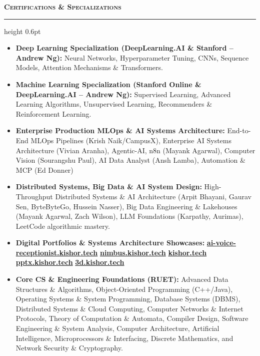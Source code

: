 \documentclass[9.5pt,a4paper]{article}
\newcommand{\resumesection}[1]{%
    \vspace{4.0pt}%
    {\color{burgundy}\scshape\bfseries\fontsize{10.0pt}{11.2pt}\selectfont #1}%
    \vspace{1.0pt}%
    \hrule height 0.6pt\relax%
    \vspace{2.5pt}%
}
\begin{document}
\resumesection{Certifications \& Specializations}
\begin{itemize}
    \item \textbf{Deep Learning Specialization (DeepLearning.AI \& Stanford -- Andrew Ng):} Neural Networks, Hyperparameter Tuning, CNNs, Sequence Models, Attention Mechanisms \& Transformers.
    \item \textbf{Machine Learning Specialization (Stanford Online \& DeepLearning.AI -- Andrew Ng):} Supervised Learning, Advanced Learning Algorithms, Unsupervised Learning, Recommenders \& Reinforcement Learning.
    \item \textbf{Enterprise Production MLOps \& AI Systems Architecture:} End-to-End MLOps Pipelines (Krish Naik/CampusX), Enterprise AI Systems Architecture (Vivian Aranha), Agentic-AI, n8n (Mayank Agarwal), Computer Vision (Sourangshu Paul), AI Data Analyst (Ansh Lamba), Automation \& MCP (Ed Donner)
    \item \textbf{Distributed Systems, Big Data \& AI System Design:} High-Throughput Distributed Systems \& AI Architecture (Arpit Bhayani, Gaurav Sen, ByteByteGo, Hussein Nasser), Big Data Engineering \& Lakehouses (Mayank Agarwal, Zach Wilson), LLM Foundations (Karpathy, Aurimas), LeetCode algorithmic mastery.
    \item \textbf{Digital Portfolios \& Systems Architecture Showcases:} \href{https://ai-voice-receptionist.kishor.tech/}{\textbf{ai-voice-receptionist.kishor.tech}} \;\textbar\; \href{https://nimbus.kishor.tech/}{\textbf{nimbus.kishor.tech}} \;\textbar\; \href{https://kishor.tech/}{\textbf{kishor.tech}} \;\textbar\; \href{https://pptx.kishor.tech/}{\textbf{pptx.kishor.tech}} \;\textbar\; \href{https://3d.kishor.tech/}{\textbf{3d.kishor.tech}}
    \item \textbf{Core CS \& Engineering Foundations (RUET):} Advanced Data Structures \& Algorithms, Object-Oriented Programming (C++/Java), Operating Systems \& System Programming, Database Systems (DBMS), Distributed Systems \& Cloud Computing, Computer Networks \& Internet Protocols, Theory of Computation \& Automata, Compiler Design, Software Engineering \& System Analysis, Computer Architecture, Artificial Intelligence, Microprocessors \& Interfacing, Discrete Mathematics, and Network Security \& Cryptography.
\end{itemize}
\end{document}
